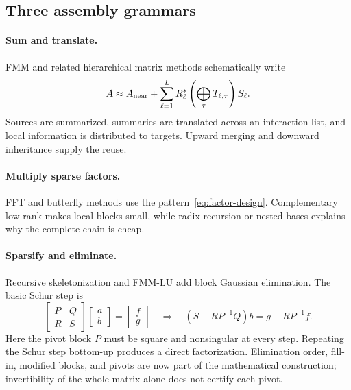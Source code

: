 \documentclass[11pt,a4paper]{article}
\begin{document}
\subsection{Three assembly grammars}
\label{sec:grammars}
\paragraph{Sum and translate.} FMM and related hierarchical matrix methods schematically write
\begin{equation}
 A\approx A_{\rm near}+\sum_{\ell=1}^L R_\ell^*
 \left(\bigoplus_\tau T_{\ell,\tau}\right)S_\ell .
 \label{eq:sum-grammar}
\end{equation}
Sources are summarized, summaries are translated across an interaction list, and local information is distributed to targets. Upward merging and downward inheritance supply the reuse.

\paragraph{Multiply sparse factors.} FFT and butterfly methods use the pattern~\eqref{eq:factor-design}. Complementary low rank makes local blocks small, while radix recursion or nested bases explains why the complete chain is cheap.

\paragraph{Sparsify and eliminate.} Recursive skeletonization and FMM-LU add block Gaussian elimination. The basic Schur step is
\begin{equation}
 \begin{bmatrix}P&Q\\R&S\end{bmatrix}
 \begin{bmatrix}a\\b\end{bmatrix}=
 \begin{bmatrix}f\\g\end{bmatrix}
 \quad\Longrightarrow\quad
 (S-RP^{-1}Q)b=g-RP^{-1}f .
 \label{eq:schur}
\end{equation}
Here the pivot block $P$ must be square and nonsingular at every step. Repeating the Schur step bottom-up produces a direct factorization. Elimination order, fill-in, modified blocks, and pivots are now part of the mathematical construction; invertibility of the whole matrix alone does not certify each pivot.
\end{document}
